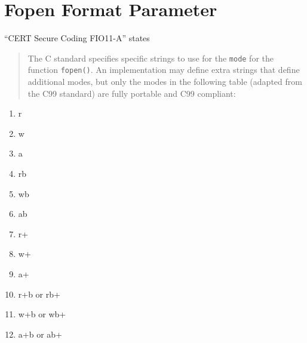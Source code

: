 %
%

\section{Fopen Format Parameter}
\label{FopenFormatParameter::overview}
``CERT Secure Coding FIO11-A'' states
\begin{quote}
The C standard specifies specific strings to use for the {\tt mode} for the function {\tt fopen()}. An implementation may define extra strings that define additional modes, but only the modes in the following table (adapted from the C99 standard) are fully portable and C99 compliant:
\end{quote}

\begin{enumerate}
\item r
\item w
\item a
\item rb
\item wb
\item ab
\item r+
\item w+
\item a+
\item r+b or rb+
\item w+b or wb+
\item a+b or ab+
\end{enumerate}

